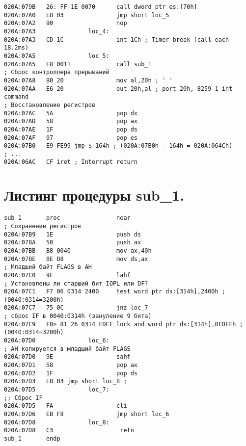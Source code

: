 \begin{lstlisting}[style={asm}]
020A:079B   26: FF 1E 0070      call dword ptr es:[70h]
020A:07A0   EB 03               jmp short loc_5 
020A:07A2   90                  nop
020A:07A3               loc_4:
020A:07A3   CD 1C               int 1Ch ; Timer break (call each 18.2ms)
020A:07A5               loc_5:
020A:07A5   E8 0011             call sub_1
; Сброс контроллера прерываний
020A:07A8   B0 20               mov al,20h ; ' '
020A:07AA   E6 20               out 20h,al ; port 20h, 8259-1 int command
; Восстановление регистров
020A:07AC   5A                  pop dx
020A:07AD   58                  pop ax
020A:07AE   1F                  pop ds
020A:07AF   07                  pop es
020A:07B0   E9 FE99 jmp $-164h ; (020A:07B0h - 164h = 020A:064Ch)
; ...
020A:06AC   CF iret ; Interrupt return
\end{lstlisting}

\pagebreak
\section*{Листинг процедуры sub\_1.}
\begin{lstlisting}[style={asm}]
sub_1       proc                near
; Сохранение регистров
020A:07B9   1E                  push ds
020A:07BA   50                  push ax
020A:07BB   B8 0040             mov ax,40h
020A:07BE   8E D8               mov ds,ax
; Младший байт FLAGS в AH
020A:07C0   9F                  lahf 
; Установлены ли старший бит IOPL или DF?
020A:07C1   F7 06 0314 2400     test word ptr ds:[314h],2400h ; (0040:0314=3200h)
020A:07C7   75 0C               jnz loc_7 
; сброс IF в 0040:0314h (зануление 9 бита)
020A:07C9   F0> 81 26 0314 FDFF lock and word ptr ds:[314h],0FDFFh ; (0040:0314=3200h)
020A:07D0               loc_6:
; AH копируется в младший байт FLAGS
020A:07D0   9E                  sahf 
020A:07D1   58                  pop ax
020A:07D2   1F                  pop ds
020A:07D3   EB 03 jmp short loc_8 ; 
020A:07D5               loc_7:
;; Сброс IF
020A:07D5   FA                  cli 
020A:07D6   EB F8               jmp short loc_6 
020A:07D8               loc_8:
020A:07D8   C3                   retn
sub_1       endp
\end{lstlisting}
